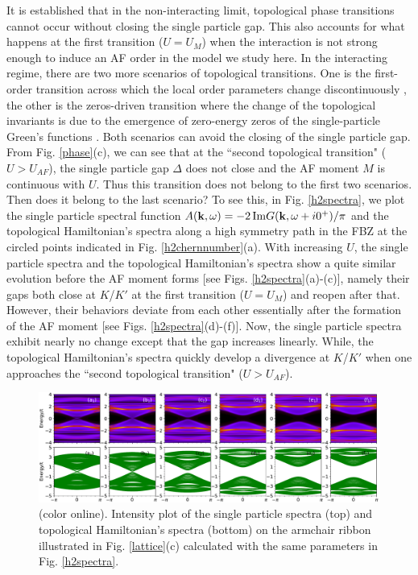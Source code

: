 \documentclass[12pt]{iopart}
\begin{document}
\par It is established that in the non-interacting limit, topological phase transitions cannot occur without closing the single particle gap. This also accounts for what happens at the first transition ($U=U_M$) when the interaction is not strong enough to induce an AF order in the model we study here. In the interacting regime, there are two more scenarios of topological transitions. One is the first-order transition across which the local order parameters change discontinuously \cite{BTS_PRB2013,ZSWZ_PRB2015,ABCTS_PRL2015}, the other is the zeros-driven transition where the change of the topological invariants is due to the emergence of zero-energy zeros of the single-particle Green's functions \cite{G_PRB2011,BTLLZ_PRB2012,SK_PRB2018}. Both scenarios can avoid the closing of the single particle gap. From Fig. \ref{phase}(c), we can see that at the ``second topological transition" ($U>U_{AF}$), the single particle gap $\Delta$ does not close and the AF moment $M$ is continuous with $U$. Thus this transition does not belong to the first two scenarios. Then does it belong to the last scenario? To see this, in Fig. \ref{h2spectra}, we plot the single particle spectral function $A(\mathbf{k},\omega)=-2\,{\rm Im} G(\mathbf{k},\omega+i0^+)/\pi$ and the topological Hamiltonian's spectra along a high symmetry path in the FBZ at the circled points indicated in Fig. \ref{h2chernnumber}(a). With increasing $U$, the single particle spectra and the topological Hamiltonian's spectra show a quite similar evolution before the AF moment forms [see Figs. \ref{h2spectra}(a)-(c)], namely their gaps both close at $K$/$K'$ at the first transition ($U=U_{M}$) and reopen after that. However, their behaviors deviate from each other essentially after the formation of the AF moment [see Figs. \ref{h2spectra}(d)-(f)]. Now, the single particle spectra exhibit nearly no change except that the gap increases linearly. While, the topological Hamiltonian's spectra quickly develop a divergence at $K$/$K'$ when one approaches the ``second topological transition" ($U>U_{AF}$).

\begin{figure}
\centering
\includegraphics[scale=0.4]{edge}
\caption{(color online). Intensity plot of the single particle spectra (top) and topological Hamiltonian's spectra (bottom) on the armchair ribbon illustrated in Fig. \ref{lattice}(c) calculated with the same parameters in Fig. \ref{h2spectra}.}\label{edge}
\end{figure}
\end{document}
